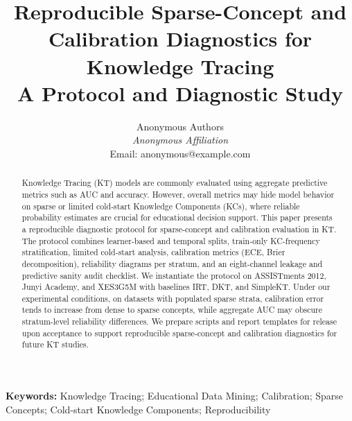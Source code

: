 \documentclass[12pt,a4paper]{jedm}
\begin{document}
\title{\sffamily\bfseries Reproducible Sparse-Concept and Calibration Diagnostics for Knowledge Tracing\\
{\large A Protocol and Diagnostic Study}}

\author{
\sffamily Anonymous Authors\\[8pt]
\normalsize \textit{Anonymous Affiliation}\\
\normalsize Email: anonymous@example.com
}
\date{}

\maketitle

\begin{abstract}
Knowledge Tracing (KT) models are commonly evaluated using aggregate predictive metrics such as AUC and accuracy. However, overall metrics may hide model behavior on sparse or limited cold‑start Knowledge Components (KCs), where reliable probability estimates are crucial for educational decision support. This paper presents a reproducible diagnostic protocol for sparse‑concept and calibration evaluation in KT. The protocol combines learner‑based and temporal splits, train‑only KC‑frequency stratification, limited cold‑start analysis, calibration metrics (ECE, Brier decomposition), reliability diagrams per stratum, and an eight‑channel leakage and predictive sanity audit checklist. We instantiate the protocol on ASSISTments 2012, Junyi Academy, and XES3G5M with baselines IRT, DKT, and SimpleKT. Under our experimental conditions, on datasets with populated sparse strata, calibration error tends to increase from dense to sparse concepts, while aggregate AUC may obscure stratum-level reliability differences. We prepare scripts and report templates for release upon acceptance to support reproducible sparse‑concept and calibration diagnostics for future KT studies.
\end{abstract}

\vspace{10pt}
\noindent\textbf{Keywords:} Knowledge Tracing; Educational Data Mining; Calibration; Sparse Concepts; Cold-start Knowledge Components; Reproducibility







\end{document}
